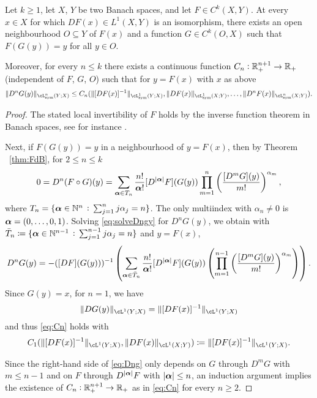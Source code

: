 \begin{theorem}
  Let $k\ge 1$, let $X$, $Y$ be two Banach spaces, and let $F\in C^k(X,Y)$.
  At every $x\in X$ for which $DF(x)\in L^1(X,Y)$ is an isomorphism,
  there exists an open neighbourhood $O\subseteq Y$ of $F(x)$ and a function
  $G\in C^k(O,X)$ such that $F(G(y))=y$ for all $y\in O$.

  Moreover, for every $n\le k$ there exists a continuous function
  $C_n:\mathbb{R}_+^{n+1}\to \mathbb{R}_+$ (independent of $F$, $G$, $O$) such
  that for $y=F(x)$ with $x$ as above
  \begin{equation}\label{eq:Cn}
    \|D^n G(y)\|_{\cL^n_{\sym}(Y;X)} \le C_n(\|[DF(x)]^{-1}\|_{\cL^1_{\sym}(Y;X)}, \|DF(x)\|_{\cL^1_{\sym}(X;Y)}, \ldots, \|D^nF(x)\|_{\cL^n_{\sym}(X;Y)}).
  \end{equation}
\end{theorem}
\begin{proof}
  The stated local invertibility of $F$ holds by the inverse function
  theorem in Banach spaces, see for instance
  \cite[Cor.~15.1]{deimling}.

  Next, if $F(G(y))=y$ in a neighbourhood of $y=F(x)$, then by
  Theorem ~\ref{thm:FdB}, for $2\le n\le k$
  \begin{equation}\label{eq:solveDngy}
    0 = D^n(F\circ G)(y) = \sum_{{\boldsymbol \alpha}\in T_n}\frac{n!}{{\boldsymbol \alpha}!}[D^{|{\boldsymbol \alpha}|}F](G(y))\prod_{m=1}^n\left(\frac{[D^m G](y)}{m!}\right)^{\alpha_m},
  \end{equation}
  where $T_n = \{{\boldsymbol \alpha} \in\mathbb{N}^n\, :\,\sum_{j=1}^n j\alpha_j = n \}$.
  The only multiindex with $\alpha_n\neq 0$ is
  ${\boldsymbol \alpha} = (0,\ldots,0,1)$. Solving \eqref{eq:solveDngy} for
  $D^nG(y)$, we obtain with
  $\bar{T}_n  \coloneqq  \{{\boldsymbol \alpha} \in\mathbb{N}^{n-1}\, :\,\sum_{j=1}^{n-1}j\alpha_j=n \}$ and
  $y=F(x)$,
  \begin{equation}\label{eq:Dng}
    D^nG(y) = -([DF](G(y)))^{-1} \left ( \sum_{{\boldsymbol \alpha}\in \bar{T}_n}\frac{n!}{{\boldsymbol \alpha}!}[D^{|{\boldsymbol \alpha}|}F](G(y)) \left( \prod_{m=1}^{n-1} \left (\frac{[D^m G](y)}{m!} \right )^{\alpha_m}\right)\right).
  \end{equation}
  Since $G(y)=x$, for $n=1$, we have
  \begin{equation*}
    \|DG(y)\|_{\cL^1(Y;X)} = \|[DF(x)]^{-1}\|_{\cL^1(Y;X)}
  \end{equation*}
  and thus \eqref{eq:Cn} holds with
  \begin{equation*}
    C_1(\|[DF(x)]^{-1}\|_{\cL^1(Y;X)},\|DF(x)\|_{\cL^1(X;Y)}) \coloneqq 
    \|[DF(x)]^{-1}\|_{\cL^1(Y;X)}.
  \end{equation*}

  Since the right-hand side of \eqref{eq:Dng} only depends on $G$
  through $D^mG$ with $m\le n-1$ and on $F$ through $D^{|{\boldsymbol \alpha}|}F$
  with $|{\boldsymbol \alpha}|\le n$, an induction argument implies the existence
  of $C_n:\mathbb{R}_+^{n+1}\to\mathbb{R}_+$ as in \eqref{eq:Cn} for every $n\ge 2$.
\end{proof}
